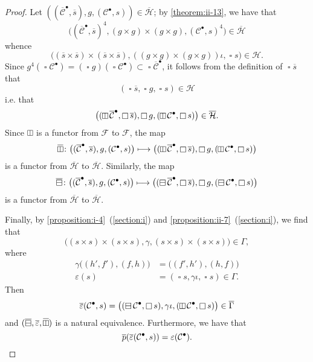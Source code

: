 \documentclass[a4paper,fleqn]{article}
\theoremstyle{plain}
\theoremstyle{definition}
\newcommand{\oldpage}[1]{{\marginpar{\footnotesize$\bigg\vert$\,\,\,\,\textit{p.~#1}}}}
\newcommand{\CC}{\mathcal{C}}
\newcommand{\HH}{\mathcal{H}}
\newcommand{\FF}{\mathcal{F}}
\newcommand{\hsqbox}{{\boxminus}}
\newcommand{\vsqbox}{{\rotatebox{90}{$\boxminus$}}}
\DeclareMathOperator{\sq}{\square}
\DeclareMathOperator{\hsq}{\raisebox{-.05em}{$\hsqbox$}}
\DeclareMathOperator{\vsq}{\raisebox{-.1em}{$\vsqbox$}}
\DeclareMathOperator{\ohsq}{\overline{\hsq}}
\DeclareMathOperator{\ovsq}{\overline{\raisebox{-.1em}{$\vsqbox$}}}
\newcommand{\smallbullet}{\bullet}
\begin{document}
\begin{proof}
  Let $((\overline{\CC}^\smallbullet,\overline{s}),g,(\CC^\smallbullet,s))\in\overline{\HH}$;
  by \cref{theorem:ii-13}, we have that
  \[
    \big(
      (\overline{\CC}^\smallbullet,\overline{s})^4,
      (g\times g)\times(g\times g),
      (\CC^\smallbullet,s)^4
    \big)
    \in\overline{\HH}
  \]
  whence
  \[
    \big(
      (\overline{s}\times\overline{s})\times(\overline{s}\times\overline{s}),
      ((g\times g)\times(g\times g))\iota,
      \sq s
    \big)
    \in\HH.
  \]
  \oldpage{422}
  Since $g^4(\sq\CC^\smallbullet)=(\sq g)(\sq\CC^\smallbullet)\subset\sq\overline{\CC}^\smallbullet$, it follows from the definition of $\sq\overline{s}$ that
  \[
    (\sq\overline{s},\sq g,\sq s)\in\HH
  \]
  i.e. that
  \[
    \big(
      (\vsq\overline{\CC}^\smallbullet,\sq\overline{s}),
      \sq g,
      (\vsq\CC^\smallbullet,\sq s)
    \big)
    \in\overline{\HH}.
  \]
  Since $\vsq$ is a functor from $\FF$ to $\FF$, the map
  \[
    \ovsq\colon
    \big(
      (\overline{\CC}^\smallbullet,\overline{s}),
      g,
      (\CC^\smallbullet,s)
    \big)
    \longmapsto
    \big(
      (\vsq\overline{\CC}^\smallbullet,\sq\overline{s}),
      \sq g,
      (\vsq\CC^\smallbullet,\sq s)
    \big)
  \]
  is a functor from $\overline{\HH}$ to $\overline{\HH}$.
  Similarly, the map
  \[
    \ohsq\colon
    \big(
      (\overline{\CC}^\smallbullet,\overline{s}),
      g,
      (\CC^\smallbullet,s)
    \big)
    \longmapsto
    \big(
      (\hsq\overline{\CC}^\smallbullet,\sq\overline{s}),
      \sq g,
      (\hsq\CC^\smallbullet,\sq s)
    \big)
  \]
  is a functor from $\overline{\HH}$ to $\overline{\HH}$.

  Finally, by \cref{proposition:i-4}~(\cref{section:i}) and \cref{proposition:ii-7}~(\cref{section:i}), we find that
  \[
    \big(
      (s\times s)\times(s\times s),
      \gamma,
      (s\times s)\times(s\times s)
    \big)
    \in\Gamma,
  \]
  where
  \[
    \begin{aligned}
      \gamma\big((h',f'),(f,h)\big)
      &= \big((f',h'),(h,f)\big)
    \\\varepsilon(s)
      &= (\sq s,\gamma\iota,\sq s)
      \in\Gamma.
    \end{aligned}
  \]
  Then
  \[
    \overline{\varepsilon}(\CC^\smallbullet,s)
    = \big(
      (\hsq\CC^\smallbullet,\sq s),
      \gamma\iota,
      (\vsq\CC^\smallbullet,\sq s)
    \big)
    \in\overline{\Gamma}
  \]
  and $(\ohsq,\overline{\varepsilon},\ovsq)$ is a natural equivalence.
  Furthermore, we have that
  \[
    \overline{p}(\overline{\varepsilon}(\CC^\smallbullet,s))
    = \varepsilon(\CC^\smallbullet).
    \qedhere
  \]
\end{proof}
\end{document}
